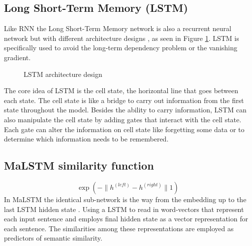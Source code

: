 \documentclass[12pt,oneside,openright,a4paper]{cpe-english-project}
\begin{document}
\subsection{Long Short-Term Memory (LSTM)}
Like RNN the Long Short-Term Memory network is also a recurrent neural network but with
different architecture designs \cite{understand_rnn}, as seen in Figure \ref*{fig:lstm_arch_design}.
LSTM is specifically used to avoid the long-term dependency problem or the vanishing gradient.

\begin{figure}[!h] \centering
  \setlength{\fboxrule}{0.2mm}
  \setlength{\fboxsep}{0.5cm}
  \caption{LSTM architecture design}
  \label{fig:lstm_arch_design}
\end{figure}

The core idea of LSTM is the cell state, the horizontal line that goes between each state. The
cell state is like a bridge to carry out information from the first state throughout the model.
Besides the ability to carry information, LSTM can also manipulate the cell state by adding gates
that interact with the cell state. Each gate can alter the information on cell state like
forgetting some data or to determine which information needs to be remembered. 

\subsection{MaLSTM similarity function}
\[\exp(-\|h^{(left)} - h^{(right)}\|1)\]
In MaLSTM the identical sub-network is the way from the embedding up to the last LSTM hidden
state \cite{manhattan_lstm, what_is_embedding_matrix}. Using a LSTM to read in word-vectors that represent each
input sentence and employs final hidden state as a vector representation for each sentence.
The similarities among these representations are employed as predictors of semantic similarity.
\end{document}
